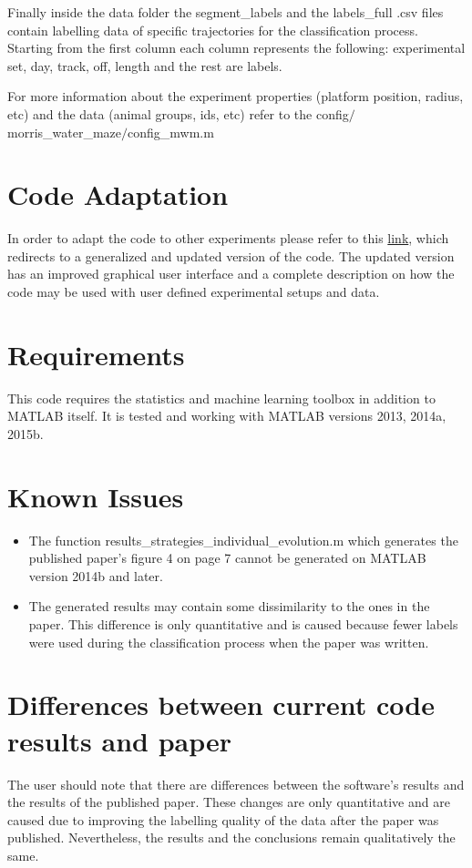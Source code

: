 \documentclass[12pt,titlepage]{article}
\begin{document}
\begin{doublespace}
Finally inside the data folder the segment\_labels and the labels\_full .csv files contain labelling data of specific trajectories for the classification process. Starting from the first column each column represents the following: experimental set, day, track, off, length and the rest are labels.

For more information about the experiment properties (platform position, radius, etc) and the data (animal groups, ids, etc) refer to the config$/$morris\_water\_maze$/$config\_mwm.m


\section{Code Adaptation}

In order to adapt the code to other experiments please refer to this \href{https://github.com/RodentDataAnalytics/roda}{link}, which redirects to a generalized and updated version of the code. The updated version has an improved graphical user interface and a complete description on how the code may be used with user defined experimental setups and data.


\section{Requirements}

This code requires the statistics and machine learning toolbox in addition to MATLAB itself.
It is tested and working with MATLAB versions 2013, 2014a, 2015b.


\section{Known Issues}

\begin{itemize}
	\item The function results\_strategies\_individual\_evolution.m which generates the published paper's figure 4 on page 7 cannot be generated on MATLAB version 2014b and later.
	\item The generated results may contain some dissimilarity to the ones in the paper. This difference is only quantitative and is caused because fewer labels were used during the classification process when the paper was written. 
\end{itemize}


\section{Differences between current code results and paper}
The user should note that there are differences between the software's results and the results of the published paper. These changes are only quantitative and are caused due to improving the labelling quality of the data after the paper was published. Nevertheless, the results and the conclusions remain qualitatively the same.


\end{doublespace}
\end{document}
